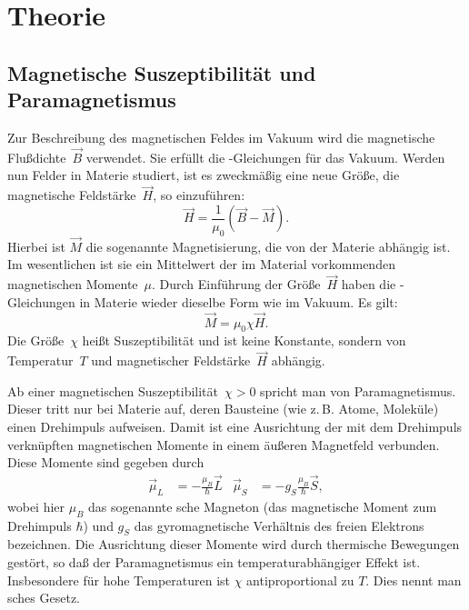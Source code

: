 

\section{Theorie}

\subsection{Magnetische Suszeptibilität und Paramagnetismus}

Zur Beschreibung des magnetischen Feldes im Vakuum wird die magnetische
Flußdichte~$\vec{B}$ verwendet.  Sie erfüllt die
-Gleichungen für das Vakuum.  Werden nun Felder in Materie
studiert, ist es zweckmäßig eine neue Größe, die magnetische
Feldstärke~$\vec{H}$, so einzuführen:
\begin{equation}
  \vec{H} = \frac{1}{\mu_0}(\vec{B} - \vec{M}).
\end{equation}
Hierbei ist $\vec{M}$ die sogenannte Magnetisierung, die von der Materie
abhängig ist.  Im wesentlichen ist sie ein Mittelwert der im Material
vorkommenden magnetischen Momente~$\mu$.  Durch Einführung der
Größe~$\vec{H}$ haben die -Gleichungen in Materie wieder
dieselbe Form wie im Vakuum.  Es gilt:
\begin{equation}
  \vec{M} = \mu_0 \chi \vec{H}.
\end{equation}
Die Größe~$\chi$ heißt Suszeptibilität und ist keine Konstante, sondern
von Temperatur~$T$ und magnetischer Feldstärke~$\vec{H}$ abhängig.

Ab einer magnetischen Suszeptibilität~$\chi>0$ spricht man von
Paramagnetismus.  Dieser tritt nur bei Materie auf, deren Bausteine (wie
z.\,B. Atome, Moleküle) einen Drehimpuls aufweisen.  Damit ist eine
Ausrichtung der mit dem Drehimpuls verknüpften magnetischen Momente in
einem äußeren Magnetfeld verbunden.  Diese Momente sind gegeben durch
\begin{align}
  \vec\mu_L &= -\frac{\mu_B}{\hbar} \vec{L} &
  \vec\mu_S &= -g_S\frac{\mu_B}{\hbar} \vec{S},
\end{align}
wobei hier $\mu_B$ das sogenannte sche Magneton (das
magnetische Moment zum Drehimpuls $\hbar$) und $g_S$ das gyromagnetische
Verhältnis des freien Elektrons bezeichnen.  Die Ausrichtung dieser
Momente wird durch thermische Bewegungen gestört, so daß der
Paramagnetismus ein temperaturabhängiger Effekt ist.  Insbesondere für
hohe Temperaturen ist $\chi$ antiproportional zu $T$.  Dies nennt man
sches Gesetz.

